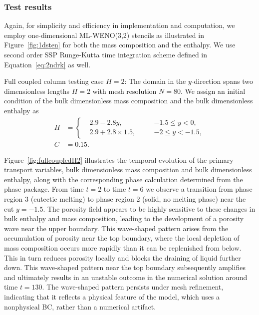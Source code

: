 \subsubsection{Test results}
Again, for simplicity and efficiency in implementation and computation, we employ
one-dimensional ML-WENO(3,2) stencils as illustrated in Figure~\ref{fig:1dsten} for 
both the mass composition and the enthalpy. We use second order SSP Runge-Kutta time
integration scheme defined in Equation~\eqref{eq:2ndrk} as well.

Full coupled column testing case $H=2$: The domain in the $y$-direction spans two dimensionless lengths $H=2$ with mesh resolution $N=80$.
We assign an initial condition of the bulk dimensionless mass composition and the bulk dimensionless enthalpy as
\begin{equation}
\begin{aligned}
H &= \left \{ 
		  \begin{alignedat}{2}
&2.9 - 2.8y, \quad &&-1.5\leq y < 0,\\
&2.9 + 2.8\times 1.5, \quad &&-2\leq y < -1.5,
		  \end{alignedat}
		  \right.\\
C &= 0.15. 
\end{aligned}
\end{equation}

Figure~\ref{fig:fullcoupledH2} illustrates the temporal evolution of the primary transport variables, bulk dimensionless
mass composition and bulk dimensionless enthalpy, along with the corresponding phase calculation determined from 
the phase package.
From time $t=2$ to time $t=6$ we observe a transition from phase region $3$ (eutectic melting) to phase region $2$ 
(solid, no melting phase) 
near the cut $y=-1.5$.
The porosity field appears to be highly sensitive to these changes in bulk enthalpy and mass composition, 
leading to the development of a porosity wave near the upper boundary. This wave-shaped
pattern arises from the accumulation of porosity near the top boundary, where the local depletion of mass 
composition occurs more rapidly than it can be replenished from below.
This in turn reduces porosity locally and blocks the draining of liquid further down.
This wave-shaped pattern near the top boundary subsequently amplifies and 
ultimately results in an unstable outcome in the numerical solution around 
time $t=130$. 
The wave-shaped pattern persists under mesh refinement, indicating that it reflects a physical feature of the 
model, which uses a nonphysical BC, rather than a numerical artifact.


